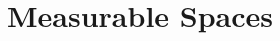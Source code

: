 \chapter{Measurable Spaces}
    \ifcsname\PATH\endcsname
        \newcommand{\PATH}{books/Analysis/Measure_Theory}
    \else
        \renewcommand{\PATH}{books/Analysis/Measure_Theory}
    \fi

    